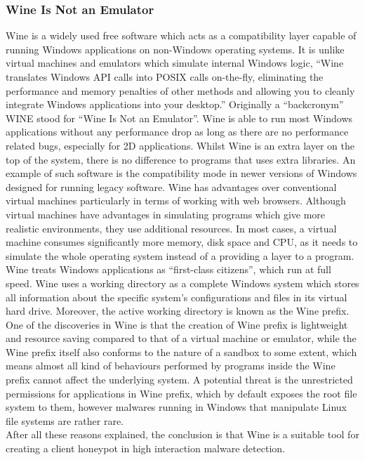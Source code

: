 \subsubsection{Wine Is Not an Emulator}
Wine is a widely used free software which acts as a compatibility layer 
capable of running Windows applications on non-Windows operating 
systems.\cite{wikiwine} It is unlike virtual machines and emulators which simulate 
internal Windows logic, ``Wine translates Windows API calls into POSIX calls 
on-the-fly, eliminating the performance and memory penalties of other methods 
and allowing you to cleanly integrate Windows applications into your 
desktop.''\cite{aboutwine} Originally a ``backcronym'' WINE stood for ``Wine Is Not an 
Emulator''. Wine is able to run most Windows applications 
without any performance drop as long as there are no performance related bugs, 
especially for 2D applications. Whilst Wine is an 
extra layer on the top of the system, there is no difference to programs that 
uses extra libraries. An example of such software is the compatibility 
mode in newer versions of Windows designed for running legacy 
software.\cite{wineperformance}
Wine has advantages over conventional virtual machines particularly in terms 
of working with web browsers. Although 
virtual machines have advantages in simulating programs which give more 
realistic environments, they use additional resources. In most cases, a 
virtual machine consumes significantly more memory, disk space and CPU, as it 
needs to simulate the whole operating system instead of a providing a layer 
to a program. Wine treats Windows applications as ``first-class citizens'', 
which run at full speed.\cite{wineperformance}
Wine uses a working directory as a complete Windows system which stores all 
information about the specific system's configurations and files in its virtual 
hard drive. Moreover, the active working directory is known as the Wine prefix. 
One of the discoveries in Wine is that the creation of Wine prefix is 
lightweight and resource saving compared to that of a virtual machine or
emulator, while the Wine prefix itself also conforms to the nature of a 
sandbox to some extent, which means almost all kind of behaviours performed 
by programs inside the Wine prefix cannot affect the underlying system. 
A potential threat is the unrestricted permissions 
for applications in Wine prefix, which by default exposes the root file 
system to them, however malwares running in Windows that manipulate Linux 
file systems are rather rare. \\
After all these reasons explained, the conclusion is that Wine is a suitable 
tool for creating a client honeypot in high interaction malware detection. 

